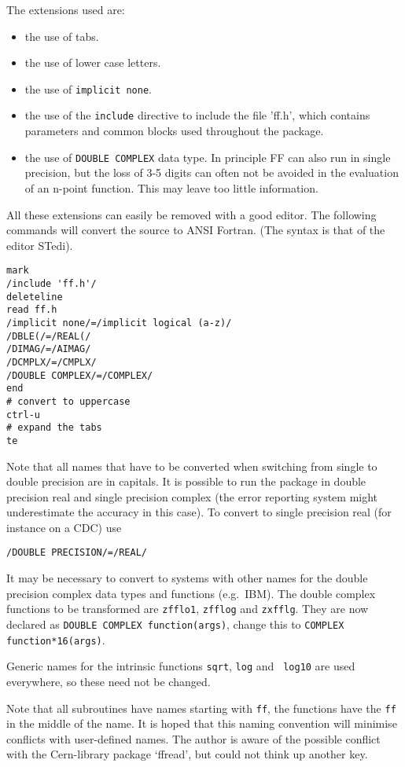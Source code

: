 The extensions used are:
\begin{itemize}
\item the use of tabs.
\item the use of lower case letters.
\item the use of {\tt implicit none}.
\item the use of the {\tt include} directive to include the file 'ff.h', which 
contains parameters and common blocks used throughout the package.
\item the use of {\tt DOUBLE COMPLEX} data type.  In principle FF can also run 
in single precision, but the loss of 3-5 digits can often not be avoided in 
the evaluation of an n-point function.  This may leave too little information.
\end{itemize}
All these extensions can easily be removed with a good editor.  The following 
commands will convert the source to ANSI Fortran.  (The syntax is that of the 
editor {\sc STedi}).
\begin{verbatim}
mark
/include 'ff.h'/
deleteline
read ff.h
/implicit none/=/implicit logical (a-z)/
/DBLE(/=/REAL(/
/DIMAG/=/AIMAG/
/DCMPLX/=/CMPLX/
/DOUBLE COMPLEX/=/COMPLEX/
end
# convert to uppercase
ctrl-u
# expand the tabs
te
\end{verbatim}							%
Note that all names that have to be converted when switching from 
single to double precision are in capitals.  It is possible to run 
the package in double precision real and single precision complex (the error 
reporting system might underestimate the accuracy in this case).  To 
convert to single precision real (for instance on a CDC) use
\begin{verbatim}
/DOUBLE PRECISION/=/REAL/
\end{verbatim}
It may be necessary to convert to systems with other names for the double 
precision complex data types and functions (e.g.~IBM).  The double complex 
functions to be transformed are {\tt zfflo1}, {\tt zfflog} and {\tt zxfflg}. 
They are now declared as {\tt DOUBLE COMPLEX function(args)}, change this to 
{\tt COMPLEX function*16(args)}.

Generic names for the intrinsic functions {\tt sqrt}, {\tt log} and {\tt 
log10} are used everywhere, so these need not be changed.

Note that all subroutines have names starting with {\tt ff}, the functions 
have the {\tt ff} in the middle of the name.  It is hoped that this naming 
convention will minimise conflicts with user-defined names.  The author is 
aware of the possible conflict with the Cern-library package `ffread', but 
could not think up another key.

